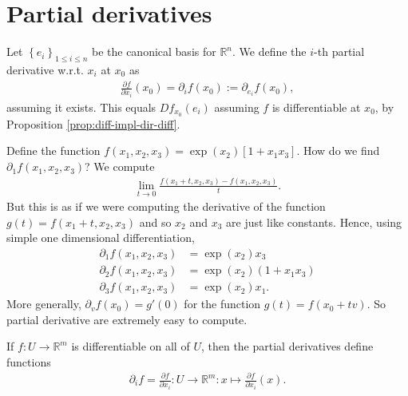 \section{Partial derivatives}

\begin{definition}\label{def:partial-der}
	Let $\left\{ e_{i} \right\}_{1 \leq i \leq n}$ be the canonical basis for $\mathbb{R}^{n}$. We define the $i$-th partial derivative w.r.t. $x_{i}$ at $x_{0}$ as
	\begin{align*}
		\frac{\partial f}{\partial x_{i}}(x_{0}) = \partial_{i}f(x_{0}) := \partial_{e_{i}}f(x_{0}),
	\end{align*}
	assuming it exists.	This equals $Df_{x_{0}}(e_{i})$ assuming $f$ is differentiable at $x_{0}$, by Proposition \ref{prop:diff-impl-dir-diff}.
\end{definition}

\begin{eg}
	Define the function $f(x_{1},x_{2},x_{3}) = \exp(x_{2})[1+x_{1}x_{3}]$. How do we find $ \partial_{1}f(x_{1},x_{2},x_{3})$? We compute
	\begin{align*}
		\lim_{t \to 0} \frac{f(x_{1}+t, x_{2}, x_{3}) - f(x_{1},x_{2},x_{3})}{t}.
	\end{align*}
	But this is as if we were computing the derivative of the function $g(t) = f(x_{1}+t, x_{2}, x_{3})$ and so $x_{2}$ and $x_{3}$ are just like constants. Hence, using simple one dimensional differentiation,
	\begin{align*}
		\partial_{{1}}f(x_{1},x_{2},x_{3}) & = \exp(x_{2}) x_{3}          \\
		\partial_{{2}}f(x_{1},x_{2},x_{3}) & = \exp(x_{2}) (1+x_{1}x_{3}) \\
		\partial_{{3}}f(x_{1},x_{2},x_{3}) & = \exp(x_{2}) x_{1}.
	\end{align*}
	More generally, $\partial_{v}f(x_{0}) = g'(0)$ for the function $g(t) = f(x_{0} + tv)$. So partial derivative are extremely easy to compute.
\end{eg}

\begin{remark}
	If $f:U \to \mathbb{R}^{m}$ is differentiable on all of $U$, then the partial derivatives define functions
	\begin{align*}
		\partial_{i}f = \frac{\partial f}{\partial x_{i}}: U \to \mathbb{R}^{m}: x \mapsto \frac{\partial f}{\partial x_{i}}(x).
	\end{align*}
\end{remark}

